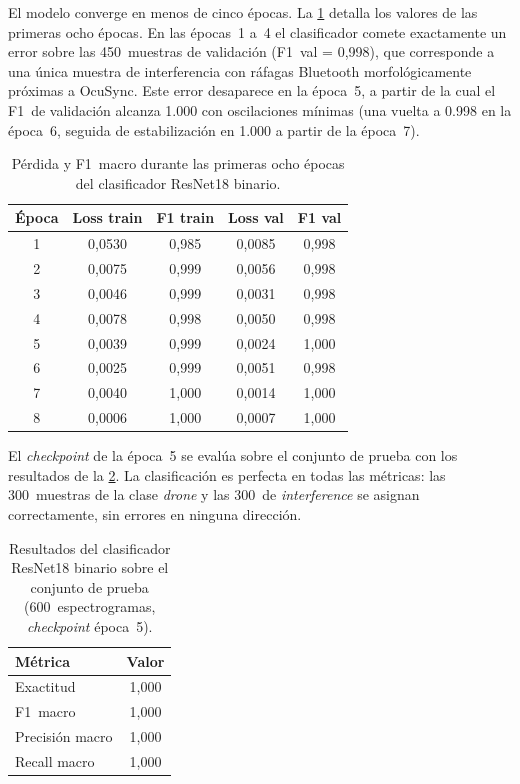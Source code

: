 El modelo converge en menos de cinco épocas. La \cref{tab:p1_curva} detalla los valores de las primeras ocho épocas. En las épocas~1 a~4 el clasificador comete exactamente un error sobre las \num{450}~muestras de validación (F1~val = 0,998), que corresponde a una única muestra de interferencia con ráfagas Bluetooth morfológicamente próximas a OcuSync. Este error desaparece en la época~5, a partir de la cual el F1~de validación alcanza \num{1,000} con oscilaciones mínimas (una vuelta a \num{0,998} en la época~6, seguida de estabilización en \num{1,000} a partir de la época~7).

\begin{table}[htbp]
\centering
\caption{Pérdida y F1~macro durante las primeras ocho épocas del clasificador ResNet18 binario.}
\label{tab:p1_curva}
\begin{tabular}{ccccc}
\toprule
\textbf{Época} & \textbf{Loss train} & \textbf{F1 train} & \textbf{Loss val} & \textbf{F1 val} \\
\midrule
1 & 0,0530 & 0,985 & 0,0085 & 0,998 \\
2 & 0,0075 & 0,999 & 0,0056 & 0,998 \\
3 & 0,0046 & 0,999 & 0,0031 & 0,998 \\
4 & 0,0078 & 0,998 & 0,0050 & 0,998 \\
5 & 0,0039 & 0,999 & 0,0024 & 1,000 \\
6 & 0,0025 & 0,999 & 0,0051 & 0,998 \\
7 & 0,0040 & 1,000 & 0,0014 & 1,000 \\
8 & 0,0006 & 1,000 & 0,0007 & 1,000 \\
\bottomrule
\end{tabular}
\end{table}

El \emph{checkpoint} de la época~5 se evalúa sobre el conjunto de prueba con los resultados de la \cref{tab:p1_test}. La clasificación es perfecta en todas las métricas: las \num{300}~muestras de la clase \emph{drone} y las \num{300}~de \emph{interference} se asignan correctamente, sin errores en ninguna dirección.

\begin{table}[htbp]
\centering
\caption{Resultados del clasificador ResNet18 binario sobre el conjunto de prueba (\num{600}~espectrogramas, \emph{checkpoint} época~5).}
\label{tab:p1_test}
\begin{tabular}{lc}
\toprule
\textbf{Métrica} & \textbf{Valor} \\
\midrule
Exactitud         & 1,000 \\
F1~macro          & 1,000 \\
Precisión macro   & 1,000 \\
Recall macro      & 1,000 \\
\bottomrule
\end{tabular}
\end{table}

